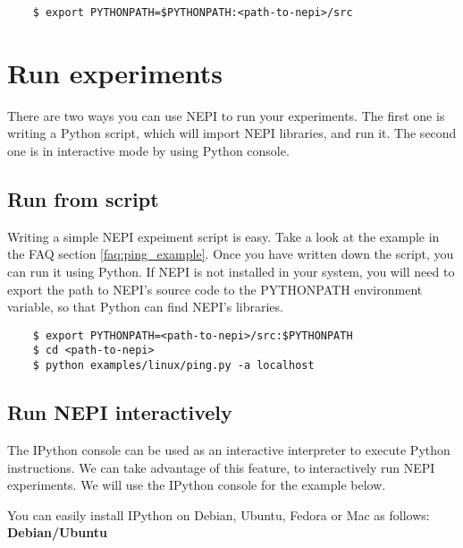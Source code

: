 \begingroup
    \fontsize{10pt}{12pt}\selectfont

\begin{verbatim}
    $ export PYTHONPATH=$PYTHONPATH:<path-to-nepi>/src 
\end{verbatim}

\endgroup

\section{Run experiments}

There are two ways you can use NEPI to run your experiments.
The first one is writing a Python script, which will import
NEPI libraries, and run it. 
The second one is in interactive mode by using Python console.

\subsection{Run from script}

Writing a simple NEPI expeiment script is easy.
Take a look at the example in the FAQ section \ref{faq:ping_example}.
Once you have written down the script, you can run it using
Python. If NEPI is not installed in your system,
you will need to export the path to NEPI's source code to 
the PYTHONPATH environment variable, so that Python can find
NEPI's libraries.

\begingroup
    \fontsize{10pt}{12pt}\selectfont

\begin{verbatim}
    $ export PYTHONPATH=<path-to-nepi>/src:$PYTHONPATH
    $ cd <path-to-nepi> 
    $ python examples/linux/ping.py -a localhost
\end{verbatim}

\endgroup

\subsection{Run NEPI interactively}

The IPython console can be used as an interactive interpreter to 
execute Python instructions. We can take advantage of this feature, 
to interactively run NEPI experiments. 
We will use the IPython console for the example below. 

You can easily install IPython on Debian, Ubuntu, Fedora or Mac as follows:\\

\textbf{Debian/Ubuntu}

